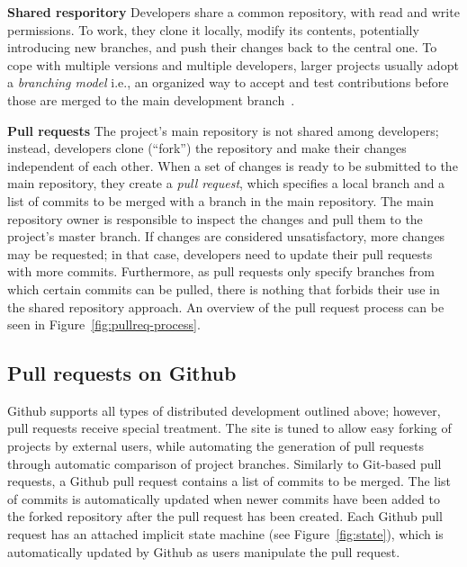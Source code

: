 \documentclass{acm_proc_article-sp}
\begin{document}
\textbf{Shared resporitory}
    Developers share a common repository, with read and
    write permissions. To work, they clone it locally, modify its contents,
    potentially introducing new branches, and push their changes back to the
    central one. To cope with multiple versions and multiple developers, larger
    projects usually adopt a {\em branching model} i.e., an organized way to
    accept and test contributions before those are merged to the main
    development branch~\cite{Bird12}. 
    

\textbf{Pull requests} The project's main repository is not shared among
developers; instead, developers clone (``fork'') the repository and make their
changes independent of each other. When a set of changes is ready to be
submitted to the main repository, they create a \emph{pull request}, which
specifies a local branch and a list of commits to be merged with a branch in the
main repository. The main repository owner is responsible to inspect the
changes and pull them to the project's master branch. If changes are considered
unsatisfactory, more changes may be requested; in that case, developers need to
update their pull requests with more commits. Furthermore, as
pull requests only specify branches from which certain commits can be pulled,
there is nothing that forbids their use in the shared repository approach. An
overview of the pull request process can be seen in Figure~\ref{fig:pullreq-process}.

\subsection{Pull requests on Github}

Github supports all types of distributed development outlined above; however,
pull requests receive special treatment. The site is tuned to allow easy forking
of projects by external users, while automating the generation of pull
requests through automatic comparison of project branches. Similarly to
Git-based pull requests, a Github pull request contains a list of commits
to be merged. The list of commits is automatically updated when newer commits have been added to the forked repository after the pull request
has been created. Each Github pull request has an attached implicit state
machine (see Figure~\ref{fig:state}), which is automatically updated by
Github as users manipulate the pull request.
\end{document}
